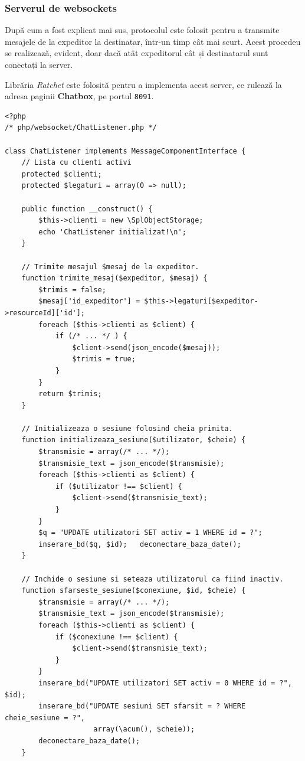 \documentclass[12pt,a4paper]{article}
\begin{document}
\subsubsection{Serverul de websockets}
După cum a fost explicat mai sus, protocolul este folosit pentru a transmite mesajele 
de la expeditor la destinatar, într-un timp cât mai scurt.  Acest procedeu se realizează, 
evident, doar dacă atât expeditorul cât și destinatarul sunt conectați la server. 

Librăria \textit{Ratchet} este folosită pentru a implementa acest server, 
ce rulează la adresa paginii \textbf{Chatbox}, pe portul \texttt{8091}.

\begin{lstlisting}
<?php
/* php/websocket/ChatListener.php */

class ChatListener implements MessageComponentInterface {
	// Lista cu clienti activi
    protected $clienti;
    protected $legaturi = array(0 => null); 

    public function __construct() {
        $this->clienti = new \SplObjectStorage;
        echo 'ChatListener initializat!\n';
    }

	// Trimite mesajul $mesaj de la expeditor.
    function trimite_mesaj($expeditor, $mesaj) {
        $trimis = false;
        $mesaj['id_expeditor'] = $this->legaturi[$expeditor->resourceId]['id'];
        foreach ($this->clienti as $client) {
            if (/* ... */ ) {
                $client->send(json_encode($mesaj));
                $trimis = true;
            }
        }
        return $trimis;
    }

	// Initializeaza o sesiune folosind cheia primita.
    function initializeaza_sesiune($utilizator, $cheie) {
        $transmisie = array(/* ... */);
        $transmisie_text = json_encode($transmisie);
        foreach ($this->clienti as $client) {
            if ($utilizator !== $client) {
                $client->send($transmisie_text);
            }
        }
        $q = "UPDATE utilizatori SET activ = 1 WHERE id = ?";
        inserare_bd($q, $id);   deconectare_baza_date();
    }

	// Inchide o sesiune si seteaza utilizatorul ca fiind inactiv.
    function sfarseste_sesiune($conexiune, $id, $cheie) {
        $transmisie = array(/* ... */);
        $transmisie_text = json_encode($transmisie);
        foreach ($this->clienti as $client) {
            if ($conexiune !== $client) {
                $client->send($transmisie_text);
            }
        }
        inserare_bd("UPDATE utilizatori SET activ = 0 WHERE id = ?", $id);
        inserare_bd("UPDATE sesiuni SET sfarsit = ? WHERE cheie_sesiune = ?", 
        			 array(\acum(), $cheie));
        deconectare_baza_date();
    }


\end{lstlisting}
\end{document}
